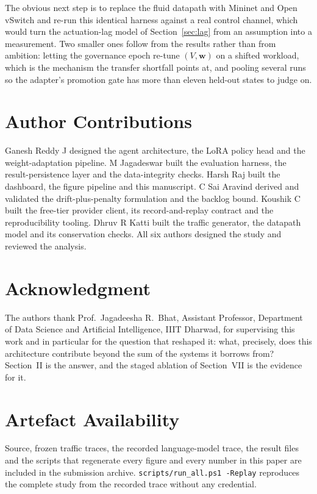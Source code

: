 \documentclass[conference]{IEEEtran}
\newcommand{\wvec}{\mathbf{w}}
\begin{document}
The obvious next step is to replace the fluid datapath with Mininet and Open
vSwitch and re-run this identical harness against a real control channel, which
would turn the actuation-lag model of Section~\ref{sec:lag} from an assumption
into a measurement. Two smaller ones follow from the results rather than from
ambition: letting the governance epoch re-tune $(V,\wvec)$ on a shifted workload,
which is the mechanism the transfer shortfall points at, and pooling several runs
so the adapter's promotion gate has more than eleven held-out states to judge on.

\section*{Author Contributions}
Ganesh Reddy J designed the agent architecture, the LoRA policy head and the
weight-adaptation pipeline. M Jagadeswar built the evaluation harness, the
result-persistence layer and the data-integrity checks. Harsh Raj built the
dashboard, the figure pipeline and this manuscript. C Sai Aravind derived and
validated the drift-plus-penalty formulation and the backlog bound. Koushik C
built the free-tier provider client, its record-and-replay contract and the
reproducibility tooling. Dhruv R Katti built the traffic generator, the datapath
model and its conservation checks. All six authors designed the study and
reviewed the analysis.

\section*{Acknowledgment}
The authors thank Prof.\ Jagadeesha R.\ Bhat, Assistant Professor, Department of
Data Science and Artificial Intelligence, IIIT Dharwad, for supervising this work
and in particular for the question that reshaped it: what, precisely, does this
architecture contribute beyond the sum of the systems it borrows from? Section~II
is the answer, and the staged ablation of Section~VII is the evidence for it.

\section*{Artefact Availability}
Source, frozen traffic traces, the recorded language-model trace, the result files
and the scripts that regenerate every figure and every number in this paper are
included in the submission archive. \texttt{scripts/run\_all.ps1 -Replay}
reproduces the complete study from the recorded trace without any credential.



\end{document}
